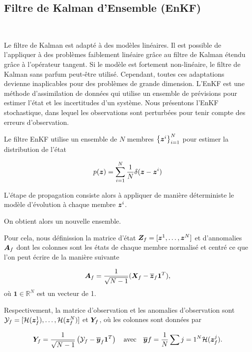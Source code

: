 \subsection{Filtre de Kalman d'Ensemble (EnKF)}~\label{sec:enkf}

Le filtre de Kalman est adapté à des modèles linéaires. Il est possible de l'appliquer à des problèmes faiblement linéaire grâce au filtre de Kalman étendu grâce à l'opérateur tangent. Si le modèle est fortement non-linéaire, le filtre de Kalman sans parfum peut-être utilisé. Cependant, toutes ces adaptations devienne inaplicables pour des problèmes de grande dimension.
L'EnKF est une méthode d'assimilation de données qui utilise un ensemble de prévisions pour estimer l'état et les incertitudes d'un système. Nous présentons l'EnKF stochastique, dans lequel les observations sont perturbées pour tenir compte des erreurs d'observation.

Le filtre EnKF utilise un ensemble de $N$ membres $\left\{\bm {\bm{z}}^i \right\}_{i=1}^N$ pour estimer la distribution de l'état

\begin{equation*}
    p(\bm{z}) = \sum_{i=1}^{N} \frac{1}{N} \delta(\bm z - \bm z^i)
\end{equation*}

L'étape de propagation consiste alors à appliquer de manière déterministe le modèle d'évolution à chaque membre $\bm z^i$.

On obtient alors un nouvelle ensemble.

Pour cela, nous définission la matrice d'état $\bm{Z}_f = [\bm{z}^1, \dots, \bm{z}^N]$ et d'annomalies $\bm A_f$ dont les colonnes sont les états de chaque membre normalisé et centré ce que l'on peut écrire de la manière suivante

\begin{equation*}
    \bm A_f = \frac{1}{\sqrt{N - 1}}(\bm X_f - \overline{\bm{z}}_f \bm{1}^T),
\end{equation*}où $\bm{1} \in \mathbb{R}^N$ est un vecteur de 1.

Respectivement, la matrice d'observation et les anomalies d'observation sont $\mathcal Y_f = [\mathcal{H}(\bm{z}^1_f), \dots, \mathcal{H}(\bm{z}^N_f)]$ et $\bm Y_f$, où les colonnes sont données par

\begin{equation*}
    \bm Y_f = \frac{1}{\sqrt{N - 1}} \left(\mathcal Y_f - \overline{\bm{y}}_f \bm{1}^T \right) \quad \text{avec} \quad \overline{\bm{y}}f = \frac{1}{N} \sum{j=1}^{N} \mathcal{H}(\bm{z}^j_f).
\end{equation*}

